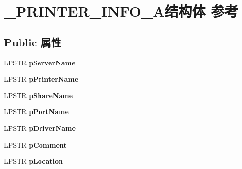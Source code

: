 \hypertarget{struct___p_r_i_n_t_e_r___i_n_f_o__2_a}{}\section{\+\_\+\+P\+R\+I\+N\+T\+E\+R\+\_\+\+I\+N\+F\+O\+\_\+A结构体 参考}
\label{struct___p_r_i_n_t_e_r___i_n_f_o__2_a}
\subsection*{Public 属性}
\begin{DoxyCompactItemize}
\item 
\mbox{\label{struct___p_r_i_n_t_e_r___i_n_f_o__2_a_a85a08dada3988942b371c1da983244cc}} 
L\+P\+S\+TR {\bfseries p\+Server\+Name}
\item 
\mbox{\label{struct___p_r_i_n_t_e_r___i_n_f_o__2_a_a1dece4531534188ae745b686130bf3af}} 
L\+P\+S\+TR {\bfseries p\+Printer\+Name}
\item 
\mbox{\label{struct___p_r_i_n_t_e_r___i_n_f_o__2_a_ae8755917ac6246ef2777d14cf1976443}} 
L\+P\+S\+TR {\bfseries p\+Share\+Name}
\item 
\mbox{\label{struct___p_r_i_n_t_e_r___i_n_f_o__2_a_a38acd4bd5a19d2c3f5b073c794f1f763}} 
L\+P\+S\+TR {\bfseries p\+Port\+Name}
\item 
\mbox{\label{struct___p_r_i_n_t_e_r___i_n_f_o__2_a_a112b87f050de968f15a5ebfc55b035de}} 
L\+P\+S\+TR {\bfseries p\+Driver\+Name}
\item 
\mbox{\label{struct___p_r_i_n_t_e_r___i_n_f_o__2_a_a91bd649e60e2b30dbab3efef569444c5}} 
L\+P\+S\+TR {\bfseries p\+Comment}
\item 
\mbox{\label{struct___p_r_i_n_t_e_r___i_n_f_o__2_a_ae4eaed5533d6dbe9936d739ec38e4955}} 
L\+P\+S\+TR {\bfseries p\+Location}
\item 
\mbox{\label{struct___p_r_i_n_t_e_r___i_n_f_o__2_a_a0b251842b9d2c6b02b2d3d497d8c4879}} 

\end{DoxyCompactItemize}
